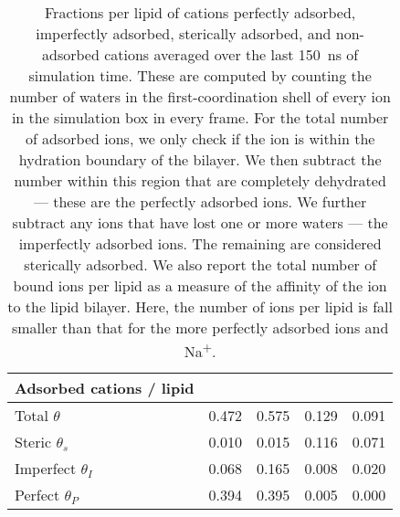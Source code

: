 \begin{table}
    \caption[Fractions per lipid of cations per adsorption mode]{Fractions per lipid of cations perfectly adsorbed, imperfectly adsorbed, sterically adsorbed, and non-adsorbed cations
        {averaged over the last 150~ns of simulation time}. These are computed
    by counting the number of waters in the first-coordination shell of every ion in the simulation box in every frame. For the total number
    of adsorbed ions, we
    only check if the ion is within the hydration boundary of the bilayer. We then subtract the number within this region that are
    completely dehydrated --- these are the perfectly adsorbed ions. We further subtract any ions that have lost 
    one or more waters --- the imperfectly adsorbed
    ions. The remaining are considered sterically adsorbed. 
    We also report the total number of bound ions per lipid as a measure 
    of the affinity of the ion to the lipid bilayer. Here, the number of \mg{}
    ions per lipid is fall smaller than that for the more perfectly adsorbed ions \li{} and Na\textsuperscript{+}.}
    \label{tabch3:cationfrac}
    \begin{tabularx}{\textwidth}{|X|X|X|X|X|}\hline
    Adsorbed cations / lipid & \na{} & \li{} & \mgmbnbfix{}   & \mgmicro{} \\\hline
    Total     $\theta$       &{0.472}&{0.575}&{0.129}&{0.091}     \\\hline
    Steric    $\theta_s$     &{0.010}&{0.015}&{0.116}&{0.071}     \\\hline
    Imperfect $\theta_I$     &{0.068}&{0.165}&{0.008}&{0.020}     \\\hline
    Perfect   $\theta_P$     &{0.394}&{0.395}&{0.005}&{0.000}     \\\hline
    \end{tabularx}
\end{table}
